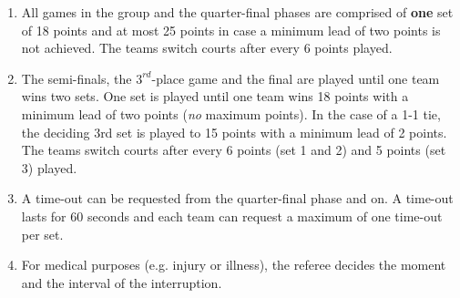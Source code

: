 \documentclass[a4paper,11pt]{article}
\begin{document}
\begin{enumerate}
\item All games in the group and the quarter-final phases are comprised of
  \textbf{one} set of 18 points and at most 25 points in case a minimum lead of
  two points is not achieved. The teams switch courts after every 6 points
  played.

\item The semi-finals, the $3^{rd}$-place game and the final are played until
  one team wins two sets. One set is played until one team wins 18 points with a
  minimum lead of two points (\textit{no} maximum points). In the case of a 1-1
  tie, the deciding 3rd set is played to 15 points with a minimum lead of 2
  points. The teams switch courts after every 6 points (set 1 and 2) and 5
  points (set 3) played.







\item A time-out can be requested from the quarter-final phase and on. A
  time-out lasts for 60 seconds and each team can request a maximum of one
  time-out per set.

\item For medical purposes (e.g. injury or illness), the referee decides the
  moment and the interval of the interruption.


\end{enumerate}
\end{document}
